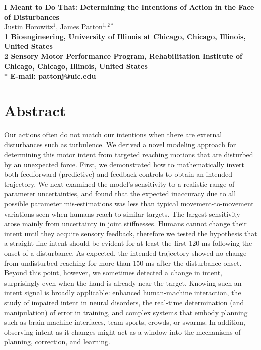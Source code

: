 \pagestyle{myheadings}

\usepackage[section]{placeins}







\begin{flushleft}
{\Large
\textbf{I Meant to Do That: Determining the Intentions of Action in the Face of Disturbances}
}
\\
Justin Horowitz$^{1}$, 
James Patton$^{1,2\ast}$
\\
\bf{1} Bioengineering, University of Illinois at Chicago, Chicago, Illinois, United States
\\
\bf{2} Sensory Motor Performance Program, Rehabilitation Institute of Chicago, Chicago, Illinois, United States
\\
$\ast$ E-mail: pattonj@uic.edu
\end{flushleft}

\section*{Abstract}
Our actions often do not match our intentions when there are external disturbances such as turbulence. We derived a novel modeling approach for determining this motor intent from targeted reaching motions that are disturbed by an unexpected force. First, we demonstrated how to mathematically invert both feedforward (predictive) and feedback controls to obtain an intended trajectory. We next examined the model's sensitivity to a realistic range of parameter uncertainties, and found that the expected inaccuracy due to all possible parameter mis-estimations was less than typical movement-to-movement variations seen when humans reach to similar targets. The largest sensitivity arose mainly from uncertainty in joint stiffnesses. Humans cannot change their intent until they acquire sensory feedback, therefore we tested the hypothesis that a straight-line intent should be evident for at least the first 120 ms following the onset of a disturbance. As expected, the intended trajectory showed no change from undisturbed reaching for more than 150 ms after the disturbance onset. Beyond this point, however, we sometimes detected a change in intent, surprisingly even when the hand is already near the target. Knowing such an intent signal is broadly applicable: enhanced human-machine interaction, the study of impaired intent in neural disorders, the real-time determination (and manipulation) of error in training, and complex systems that embody planning such as brain machine interfaces, team sports, crowds, or swarms. In addition, observing intent as it changes might act as a window into the mechanisms of planning, correction, and learning.

